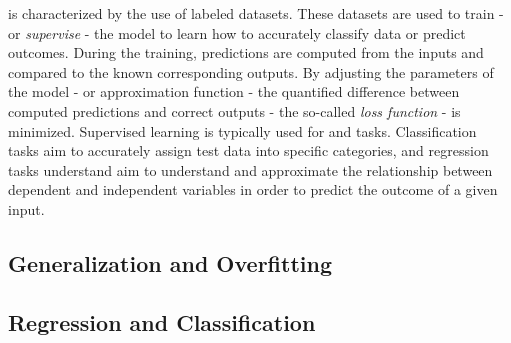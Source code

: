 is characterized by the use of labeled datasets.
These datasets are used to train - or \textit{supervise} - the model to learn how to accurately classify data or predict outcomes.
During the training, predictions are computed from the inputs and compared to the known corresponding outputs.
By adjusting the parameters of the model - or approximation function - the quantified difference between computed predictions and correct outputs - the so-called \textit{loss function} - is minimized.
Supervised learning is typically used for  and  tasks.
Classification tasks aim to accurately assign test data into specific categories, and regression tasks understand aim to understand and approximate the relationship between dependent and independent variables in order to predict the outcome of a given input.

\subsection{Generalization and Overfitting}

\subsection{Regression and Classification}






